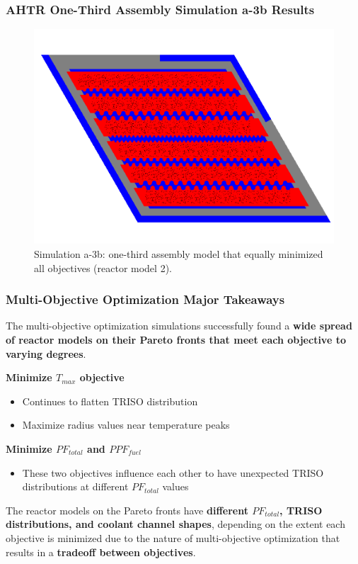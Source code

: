 \begin{frame}
    \frametitle{AHTR One-Third Assembly Simulation a-3b Results}
    \begin{figure}
        \includegraphics[width=0.75\linewidth]{../docs/figures/assem-obj-3-all-min-all.png} 
        \caption{Simulation a-3b: one-third assembly model that equally minimized all 
        objectives (reactor model 2).}
    \end{figure}
\end{frame}

\begin{frame}
    \frametitle{Multi-Objective Optimization Major Takeaways}
    The multi-objective optimization simulations successfully found a \textbf{wide 
    spread of reactor models on their Pareto fronts that meet each objective to varying 
    degrees}. 

    \vspace{0.3cm}
    \textbf{Minimize $T_{max}$ objective} 
    \begin{itemize}
        \item Continues to flatten TRISO distribution 
        \item Maximize radius values near temperature peaks 
    \end{itemize}

    \textbf{Minimize $PF_{total}$ and $PPF_{fuel}$} 
    \begin{itemize}
    \item These two objectives influence each other to have unexpected TRISO
    distributions at different $PF_{total}$ values
    \end{itemize} 

    \vspace{0.3cm}
    The reactor models on the Pareto fronts have \textbf{different $PF_{total}$, 
    TRISO distributions, and coolant channel shapes}, depending on the extent 
    each objective is minimized due to the nature of multi-objective
    optimization that results in a \textbf{tradeoff between objectives}. 


\end{frame}

